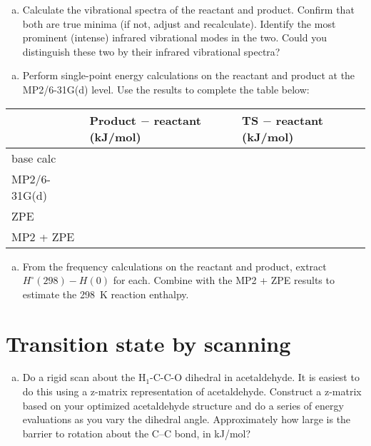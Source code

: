 \documentclass[11pt]{article}
\begin{document}
\begin{enumerate}[(c)]
\item Calculate the vibrational spectra of the reactant and product. Confirm that both are true minima (if not, adjust and recalculate). Identify the most prominent (intense) infrared vibrational modes in the two. Could you distinguish these two by their infrared vibrational spectra?
\end{enumerate}

\begin{enumerate}[(d)]
\item Perform single-point energy calculations on the reactant and product at the MP2/6-31G(d) level.  Use the results to complete the table below:
\end{enumerate}

\begin{center}
\begin{tabular}{lll}
\hline
 & Product \(-\) reactant  (kJ/mol) & TS \(-\) reactant (kJ/mol)\\
\hline
base calc &  & \\
MP2/6-31G(d) &  & \\
ZPE &  & \\
MP2 + ZPE &  & \\
\hline
\end{tabular}
\end{center}

\begin{enumerate}[(e)]
\item From the frequency calculations on the reactant and product, extract \(H^{\circ}(298)-H(0)\) for each.  Combine with the MP2 + ZPE results to estimate the \SI{298}{K} reaction enthalpy.
\end{enumerate}

\section{Transition state by scanning}
\label{sec:orgc991a04}
\begin{enumerate}[(a)]
\item Do a rigid scan about the H\(_{\text{1}}\)-C-C-O dihedral in acetaldehyde. It is easiest to do this using a z-matrix representation of acetaldehyde. Construct a z-matrix based on your optimized acetaldehyde structure and do a series of energy evaluations as you vary the dihedral angle. Approximately how large is the barrier to rotation about the C–C bond, in kJ/mol?
\end{enumerate}
\end{document}
